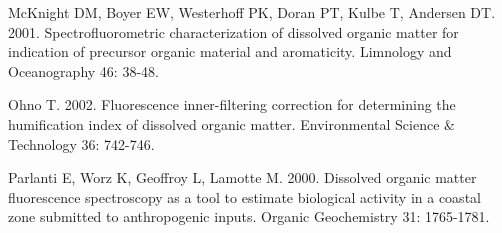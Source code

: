 \documentclass[a4paper,11pt]{article}\usepackage[]{graphicx}\usepackage[]{color}
\begin{document}
McKnight DM, Boyer EW, Westerhoff PK, Doran PT, Kulbe T, Andersen DT. 2001. Spectrofluorometric characterization of dissolved organic matter for indication of precursor organic material and aromaticity. Limnology and Oceanography 46: 38-48.

Ohno T. 2002. Fluorescence inner-filtering correction for determining the humification index of dissolved organic matter. Environmental Science & Technology 36: 742-746.

Parlanti E, Worz K, Geoffroy L, Lamotte M. 2000. Dissolved organic matter fluorescence spectroscopy as a tool to estimate biological activity in a coastal zone submitted to anthropogenic inputs. Organic Geochemistry 31: 1765-1781.
\end{document}
